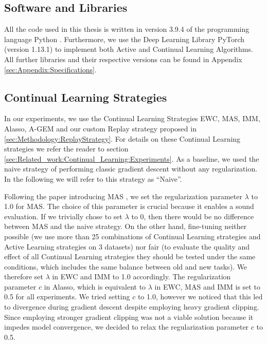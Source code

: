 \subsection{Software and Libraries}
\label{sec:ExperimentSetup:Software}
All the code used in this thesis is written in version 3.9.4 of the programming language Python \cite{Rossum1995Python}. Furthermore, we use the Deep
Learning Library PyTorch \cite{paszke2019pytorch} (version 1.13.1) to implement both Active and Continual Learning Algorithms. All further libraries
and their respective versions can be found in Appendix \ref{sec:Appendix:Specifications}.

\subsection{Continual Learning Strategies}
\label{sec:ExperimentSetup:CLStrategies}
In our experiments, we use the Continual Learning Strategies EWC, MAS, IMM, Alasso, A-GEM and our custom Replay strategy proposed in \ref{sec:Methodology:ReplayStrategy}.
For details on these Continual Learning strategies we refer the reader to section \ref{sec:Related_work:Continual_Learning:Experiments}. As a baseline,
we used the naive strategy of performing classic gradient descent without any regularization. In the following we will refer to this strategy as
\enquote{Naive}. \par
Following the paper introducing MAS \cite{aljundi2018memory}, we set the regularization parameter $\lambda$ to 1.0 for MAS. The choice of this parameter
is crucial because it enables a sound evaluation. If we trivially chose to set $\lambda$ to 0, then there would be no difference between MAS and the naive
strategy. On the other hand, fine-tuning neither possible (we use more than 25 combinations of Continual Learning strategies and Active Learning strategies 
on 3 datasets) nor fair (to evaluate the quality and effect of all Continual Learning strategies they should be tested under the same conditions, which
includes the same balance between old and new tasks). We therefore set $\lambda$ in EWC and IMM to 1.0 accordingly. The regularization parameter $c$ in
Alasso, which is equivalent to $\lambda$ in EWC, MAS and IMM is set to 0.5 for all experiments. We tried setting $c$ to 1.0, however we noticed that this
led to divergence during gradient descent despite employing heavy gradient clipping. Since employing stronger gradient clipping was not a viable solution
because it impedes model convergence, we decided to relax the regularization parameter $c$ to 0.5. \par
